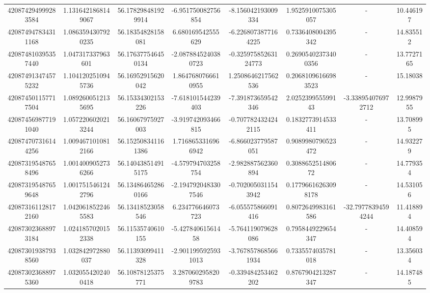 \documentclass{article}
\begin{document}
\begin{landscape}
\begin{longtable}[c]{S[table-format=18.0]S[table-format=2.15]S[table-format=2.15]S[table-format=-2.17]S[table-format=-2.16]S[table-format=-2.16]S[table-format=-3.16]S[table-format=2.7]}
420874294999283584 & 1.1316421868149067 & 56.178298481929914 & -6.951750082756854   & -8.156042193009334     & 1.9525910075305057  & {-}                  & 10.446197  \\
420874947834311168 & 1.0863594307920235 & 56.18354828158081  & 6.680169542555629    & -6.2268073877164225    & 0.7336408004395342  & {-}                  & 14.835512  \\
420874810395357440 & 1.047317337963601  & 56.176377546450134 & -2.0878845240380723  & -0.32597585263124773   & 0.26905402373400356 & {-}                  & 13.7727165 \\
420874913474575232 & 1.1041202510945736 & 56.16952915620042  & 1.8647680766610955   & 1.2508646217562536     & 0.20681096166983523 & {-}                  & 15.18038   \\
420874501157717504 & 1.0892600512135695 & 56.15334302153226  & -7.618101544239403   & -7.391873659542346     & 2.025239955599143   & -3.338954076972712  & 12.9987955 \\
420874569877191040 & 1.0572206020213244 & 56.16067975927003  & -3.919742093466815   & -0.7077824324242115    & 0.1832773914533411  & {-}                  & 13.708995  \\
420874707316144256 & 1.0094671010812166 & 56.152508341161386 & 1.7168653316966942   & -6.866023779587051     & 0.9089980790523472  & {-}                  & 14.932279  \\
420873195487658496 & 1.0014009052736266 & 56.140438514915175 & -4.579794703258754   & -2.982887562360894     & 0.308865251480672   & {-}                  & 14.779354  \\
420873195487659648 & 1.0017515461242796 & 56.134864652860166 & -2.1947920483307546  & -0.7020050311543942    & 0.17796616263098178 & {-}                  & 14.531056  \\
420873161128172160 & 1.0420618522465583 & 56.13418523058546  & 6.234776646073723    & -6.055575866091416     & 0.8072649983161586  & -32.79778394594244  & 11.418894  \\
420873023688973184 & 1.0241857020152338 & 56.11535740610155  & -5.42784061561458    & -5.764119079628086     & 0.7958449229654347  & {-}                  & 14.408594  \\
420873019387938560 & 1.032842972880037  & 56.11393099411328  & -2.9011995925931013  & -3.7678578685661934    & 0.7335574035781018  & {-}                  & 13.356034  \\
420873023688975360 & 1.0320554202400418 & 56.10878125375771  & 3.2870602958209783   & -0.339484253462202     & 0.8767904213287347  & {-}                  & 14.187485  \\

\end{longtable}
\end{landscape}
\end{document}
